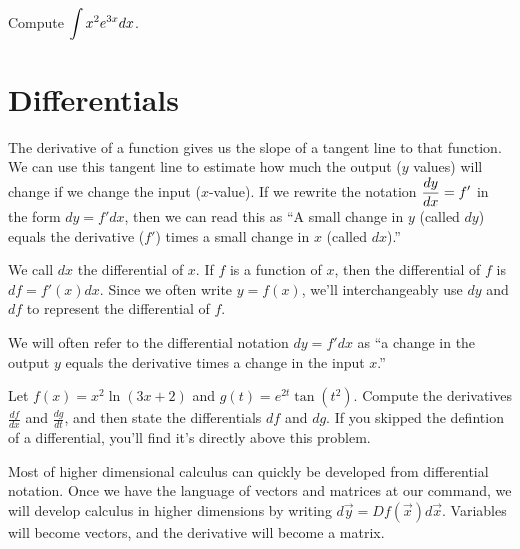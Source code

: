 \begin{problem}
Compute $\displaystyle \int x^2 e^{3x} dx$.
\end{problem}



\section{Differentials}
The derivative of a function gives us the slope of a tangent line to that function. We can use this tangent line to estimate how much the output ($y$ values) will change if we change the input ($x$-value). If we rewrite the notation $\displaystyle\frac{dy}{dx}=f'$ in the form $dy=f' dx$, then we can read this as ``A small change in $y$ (called $dy$) equals the derivative ($f'$) times a small change in $x$ (called $dx$).'' 

\begin{definition}
We call $dx$ the differential of $x$.  If $f$ is a function of $x$, then the differential of $f$ is $df = f'(x) dx$. Since we often write $y=f(x)$, we'll interchangeably use $dy$ and $df$ to represent the differential of $f$. 

We will often refer to the differential notation $dy=f'dx$ as ``a change in the output $y$ equals the derivative times a change in the input $x$.'' 
\end{definition}

\begin{problem}
Let $f(x) = x^2\ln(3x+2)$ and $g(t) = e^{2t}\tan(t^2)$. Compute the derivatives $\frac{df}{dx}$ and $\frac{dg}{dt}$, and then state the differentials $df$ and $dg$. If you skipped the defintion of a differential, you'll find it's directly above this problem.  
\end{problem}

Most of higher dimensional calculus can quickly be developed from differential notation. Once we have the language of vectors and matrices at our command, we will develop calculus in higher dimensions by writing $d\vec y = Df(\vec x) d\vec x$.  Variables will become vectors, and the derivative will become a matrix.
 
